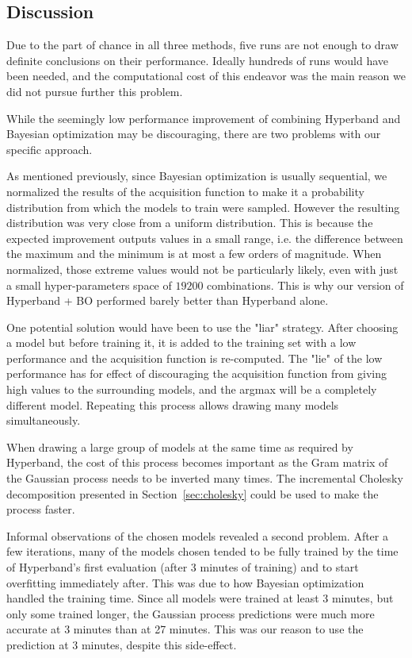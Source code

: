 \subsection{Discussion}

Due to the part of chance in all three methods, five runs are not enough to draw definite conclusions on their performance. Ideally hundreds of runs would have been needed, and the computational cost of this endeavor was the main reason we did not pursue further this problem.

While the seemingly low performance improvement of combining Hyperband and Bayesian optimization may be discouraging, there are two problems with our specific approach. 

As mentioned previously, since Bayesian optimization is usually sequential, we normalized the results of the acquisition function to make it a probability distribution from which the models to train were sampled. However the resulting distribution was very close from a uniform distribution. This is because the expected improvement outputs values in a small range, i.e. the difference between the maximum and the minimum is at most a few orders of magnitude. When normalized, those extreme values would not be particularly likely, even with just a small hyper-parameters space of $19 200$ combinations. This is why our version of Hyperband + BO performed barely better than Hyperband alone. 

One potential solution would have been to use the "liar" strategy. After choosing a model but before training it, it is added to the training set with a low performance and the acquisition function is re-computed. The "lie" of the low performance has for effect of discouraging the acquisition function from giving high values to the surrounding models, and the argmax will be a completely different model. Repeating this process allows drawing many models simultaneously. 

When drawing a large group of models at the same time as required by Hyperband, the cost of this process becomes important as the Gram matrix of the Gaussian process needs to be inverted many times. The incremental Cholesky decomposition presented in Section~\ref{sec:cholesky} could be used to make the process faster.

Informal observations of the chosen models revealed a second problem. After a few iterations, many of the models chosen tended to be fully trained by the time of Hyperband's first evaluation (after 3 minutes of training) and to start overfitting immediately after. This was due to how Bayesian optimization handled the training time. Since all models were trained at least 3 minutes, but only some trained longer, the Gaussian process predictions were much more accurate at 3 minutes than at 27 minutes. This was our reason to use the prediction at 3 minutes, despite this side-effect.

